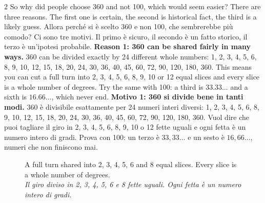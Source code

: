 \documentclass[10pt,a4paper,oneside]{book}
\newif\ifIT
\newenvironment{bi}%
  {\begin{paracol}{2}\global\ITfalse\selectlanguage{english}}%
  {\end{paracol}}
\newcommand{\IT}{\switchcolumn\global\ITtrue\selectlanguage{italian}}
\newcommand{\EN}{\switchcolumn*\global\ITfalse\selectlanguage{english}}
\newcommand{\bicap}[2]{\caption{#1\\{\color{itgreen}\itshape #2}}}
\begin{document}
\begin{bi}
So why did people choose 360 and not 100, which would seem easier? There are three reasons. The first one is certain, the second is historical fact, the third is a likely guess.
\IT
Allora perché si è scelto 360 e non 100, che sembrerebbe più comodo? Ci sono tre motivi. Il primo è sicuro, il secondo è un fatto storico, il terzo è un'ipotesi probabile.
\EN
\textbf{Reason 1: 360 can be shared fairly in many ways.} 360 can be divided exactly by 24 different whole numbers: 1, 2, 3, 4, 5, 6, 8, 9, 10, 12, 15, 18, 20, 24, 30, 36, 40, 45, 60, 72, 90, 120, 180, 360. This means you can cut a full turn into 2, 3, 4, 5, 6, 8, 9, 10 or 12 equal slices and every slice is a whole number of degrees. Try the same with 100: a third is $33.33\ldots$ and a sixth is $16.66\ldots$, which never end.
\IT
\textbf{Motivo 1: 360 si divide bene in tanti modi.} 360 è divisibile esattamente per 24 numeri interi diversi: 1, 2, 3, 4, 5, 6, 8, 9, 10, 12, 15, 18, 20, 24, 30, 36, 40, 45, 60, 72, 90, 120, 180, 360. Vuol dire che puoi tagliare il giro in 2, 3, 4, 5, 6, 8, 9, 10 o 12 fette uguali e ogni fetta è un numero intero di gradi. Prova con 100: un terzo è $33{,}33\ldots$ e un sesto è $16{,}66\ldots$, numeri che non finiscono mai.
\end{bi}

\begin{figure}[htbp]
\centering
\bicap{A full turn shared into 2, 3, 4, 5, 6 and 8 equal slices. Every slice is a whole number of degrees.}%
      {Il giro diviso in 2, 3, 4, 5, 6 e 8 fette uguali. Ogni fetta è un numero intero di gradi.}
\label{fig:pizzas}
\end{figure}
\end{document}
